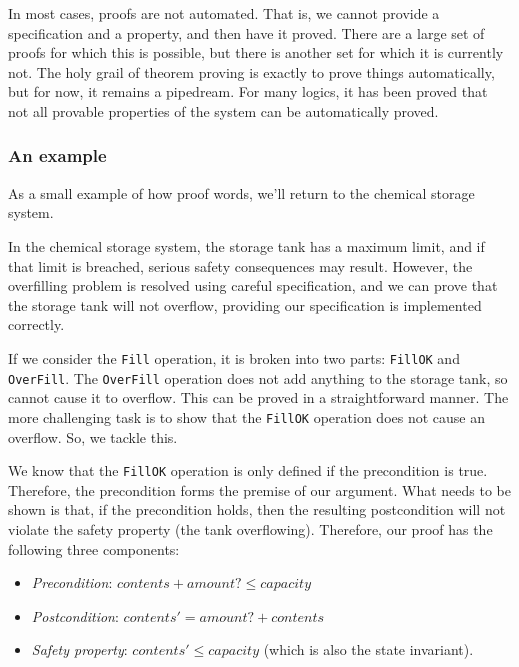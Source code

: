 In most cases, proofs are not automated. That is, we cannot provide a specification and a property, and then have it proved. There are a large set of proofs for which this is possible, but there is another set for which it is currently not. The holy grail of theorem proving is exactly to prove things automatically, but for now, it remains a pipedream. For many logics, it has been proved that not all provable properties of the system can be automatically proved.

\subsubsection*{An example}

As a small example of how proof words, we'll return to the chemical storage system. 

\begin{example}

In the chemical storage system, the storage tank has a maximum limit, and if that limit is breached, serious safety consequences may result.
However, the overfilling problem is resolved using careful specification, and we can prove that the storage tank will not overflow, providing our specification is implemented correctly.

If we consider the \texttt{Fill} operation, it is broken into two parts: \texttt{FillOK} and \texttt{OverFill}. The \texttt{OverFill} operation does not add anything to the storage tank, so cannot cause it to overflow. This can be proved in a straightforward manner. The more challenging task is to show that the \texttt{FillOK} operation does not cause an overflow. So, we tackle this.

We know that the \texttt{FillOK} operation is only defined if the precondition is true. Therefore, the precondition forms the premise of our argument. What needs to be shown is that, if the precondition holds, then the resulting postcondition will not violate the safety property (the tank overflowing). Therefore, our proof has the following three components:

\begin{itemize}

 \item \emph{Precondition}: $contents + amount? \leq capacity$

 \item \emph{Postcondition}: $contents' = amount? + contents$

 \item \emph{Safety property}: $contents' \leq capacity$ (which is also the state invariant).


\end{itemize}
\end{example}
